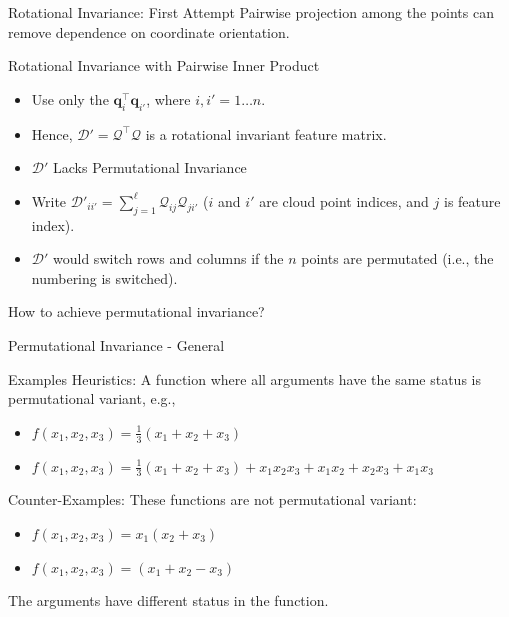 \documentclass[presentation,aspectratio=169]{beamer}
\begin{document}
\begin{frame}[label={sec:org0d58ec1}]{Rotational Invariance: First Attempt}
Pairwise projection among the points can remove dependence on coordinate orientation.

\begin{block}{Rotational Invariance with Pairwise Inner Product}
\begin{itemize}
\item Use only the \(\mathbf{q}_i^\top \mathbf{q}_{i'}\), where
\(i, i' = 1 \ldots n\).

\item Hence, \(\mathcal{D}' = \mathcal{Q}^\top  \mathcal{Q}\) is a rotational
invariant feature matrix.

\item \(\mathcal{D}'\) Lacks Permutational Invariance

\item Write
\(\mathcal{D}'_{i i'} = \sum_{j=1}^{\ell} \mathcal{Q}_{ij} \mathcal{Q}_{ji'}\)
(\(i\) and \(i'\) are cloud point indices, and \(j\) is feature index).

\item \(\mathcal{D}'\) would switch rows and columns if the \(n\) points are
permutated (i.e., the numbering is switched).
\end{itemize}
\end{block}

How to achieve permutational invariance?
\end{frame}

\begin{frame}[label={sec:orgbcb1911}]{Permutational Invariance - General}
\begin{exampleblock}{Examples}
 Heuristics: A function where all arguments have the same status
is permutational variant, e.g.,

\begin{itemize}
\item \(f(x_1, x_2, x_3) = \frac{1}{3}(x_1 + x_2 + x_3)\)

\item \(f(x_1, x_2, x_3) = \frac{1}{3}(x_1 + x_2 + x_3) + x_1 x_2 x_3 + x_1 x_2 + x_2 x_3 + x_1 x_3\)
\end{itemize}
\end{exampleblock}

\begin{alertblock}{Counter-Examples:}
These functions are \alert{not} permutational variant:

\begin{itemize}
\item \(f(x_1, x_2, x_3) = x_1(x_2+x_3)\)

\item \(f(x_1, x_2, x_3) = (x_1+x_2 - x_3)\)
\end{itemize}

The arguments have different status in the function.
\end{alertblock}
\end{frame}
\end{document}
